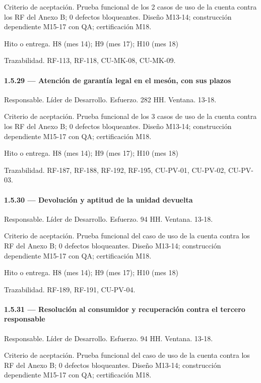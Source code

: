 \documentclass[11pt]{article}
\begin{document}
Criterio de aceptación. Prueba funcional de los 2 casos de uso de la cuenta contra los RF del Anexo B; 0 defectos bloqueantes. Diseño M13-14; construcción dependiente M15-17 con QA; certificación M18.

Hito o entrega. H8 (mes 14); H9 (mes 17); H10 (mes 18)

Trazabilidad. RF-113, RF-118, CU-MK-08, CU-MK-09.

\paragraph{1.5.29 — Atención de garantía legal en el mesón, con sus plazos}

Responsable. Líder de Desarrollo. Esfuerzo. 282 HH. Ventana. 13-18.

Criterio de aceptación. Prueba funcional de los 3 casos de uso de la cuenta contra los RF del Anexo B; 0 defectos bloqueantes. Diseño M13-14; construcción dependiente M15-17 con QA; certificación M18.

Hito o entrega. H8 (mes 14); H9 (mes 17); H10 (mes 18)

Trazabilidad. RF-187, RF-188, RF-192, RF-195, CU-PV-01, CU-PV-02, CU-PV-03.

\paragraph{1.5.30 — Devolución y aptitud de la unidad devuelta}

Responsable. Líder de Desarrollo. Esfuerzo. 94 HH. Ventana. 13-18.

Criterio de aceptación. Prueba funcional del caso de uso de la cuenta contra los RF del Anexo B; 0 defectos bloqueantes. Diseño M13-14; construcción dependiente M15-17 con QA; certificación M18.

Hito o entrega. H8 (mes 14); H9 (mes 17); H10 (mes 18)

Trazabilidad. RF-189, RF-191, CU-PV-04.

\paragraph{1.5.31 — Resolución al consumidor y recuperación contra el tercero responsable}

Responsable. Líder de Desarrollo. Esfuerzo. 94 HH. Ventana. 13-18.

Criterio de aceptación. Prueba funcional del caso de uso de la cuenta contra los RF del Anexo B; 0 defectos bloqueantes. Diseño M13-14; construcción dependiente M15-17 con QA; certificación M18.
\end{document}
